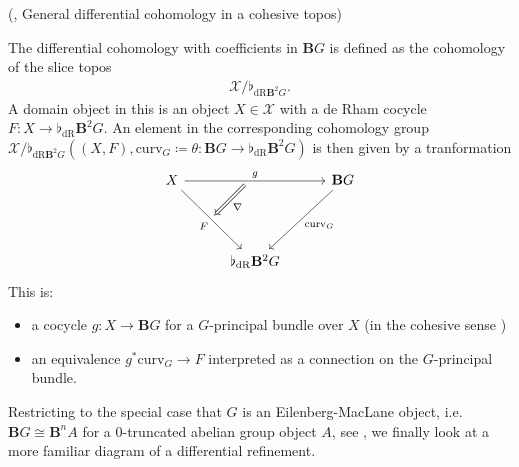 \documentclass[10pt]{amsart}
\begin{document}
\begin{definition}
  (\cite[Def. 3.9.32., Rmk. 3.9.33.]{schreiber2013cohesive}, General
  differential cohomology in a cohesive topos)

  The differential cohomology with coefficients in $\mathbf{B}G$ is
  defined as the cohomology of the slice topos
  \begin{align*}
     \mathcal{X}/\flat_{\mathrm{dR} \mathbf{B}^2 G}.
  \end{align*}
  A domain object in this is an object $X\in \mathcal{X}$ with a de
  Rham cocycle $F\colon X\rightarrow \flat_{\mathrm{dR}}\mathbf{B}^2
  G$.
  An element in the corresponding cohomology group
  $\mathcal{X}/\flat_{\mathrm{dR} \mathbf{B}^2 G}((X,F),
  \mathrm{curv}_{G} \coloneqq \theta \colon \mathbf{B}G
  \rightarrow \flat_{\mathrm{dR}}\mathbf{B}^2G)$ is then given by a
  tranformation
  \begin{equation}
    \begin{tikzcd}[nodes in empty cells, column sep= 1cm, row sep=1.5cm]
      X
      \ar[rr, "g"{name=g}]
      \ar[dr, swap,"F"{name=F}]
      \arrow[Rightarrow, shorten = 4pt, from=g, to=F , "\nabla"]
      &
      &
      \mathbf{B}G
      \ar[dl, "\mathrm{curv}_{G}"]
      \\
      &
      \flat_{\mathrm{dR}}\mathbf{B}^2G
      &
    \end{tikzcd}
  \end{equation}
  This is:
  \begin{itemize}
    \item a cocycle $g\colon X \rightarrow \mathbf{B}G$ for a
      $G$-principal bundle over $X$ (in the cohesive sense \cite[Def 3.6.152.]{schreiber2013cohesive})
    \item an equivalence $g^* \mathrm{curv}_{G} \rightarrow F$
      interpreted as a connection on the $G$-principal bundle.
  \end{itemize}
\end{definition}

Restricting to the special case that $G$ is an Eilenberg-MacLane
object, i.e. $\mathbf{B}G \cong \mathbf{B}^n A$ for a $0$-truncated
abelian group object $A$, see \cite[Def. 5.5.6.1.]{lurie2009htt}, we
finally look at a more familiar diagram of a differential refinement.
\end{document}
